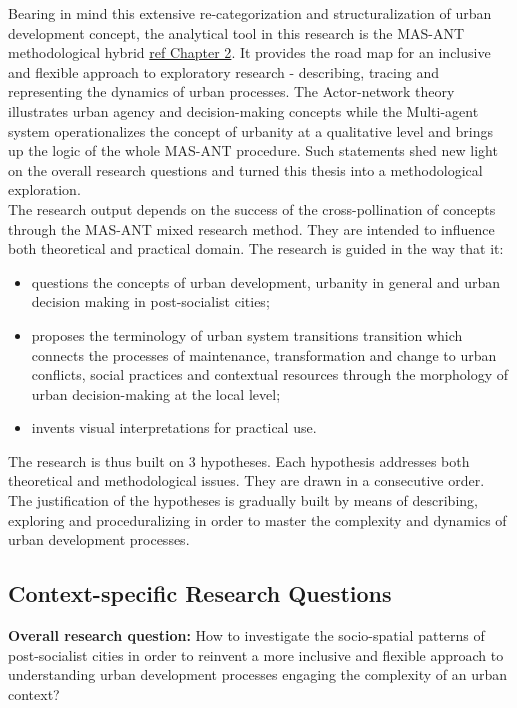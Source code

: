 \documentclass[11pt]{report}
\begin{document}
Bearing in mind this extensive re-categorization and structuralization of urban development concept, the analytical tool in this research is the MAS-ANT methodological hybrid \href{ref}{ref Chapter 2}. 
It provides the road map for an inclusive and flexible approach to exploratory research - describing, tracing and representing the dynamics of urban processes.
The Actor-network theory illustrates urban agency and decision-making concepts while the Multi-agent system operationalizes the concept of urbanity at a qualitative level and brings up the logic of the whole MAS-ANT procedure. Such statements shed new light on the overall research questions and turned this thesis into a methodological exploration.
\\
The research output depends on the success of the cross-pollination of concepts through the MAS-ANT mixed research method. They are intended to influence both theoretical and practical domain. The research is guided in the way that it:
\begin{itemize}
\item questions the concepts of urban development, urbanity in general and urban decision making in post-socialist cities;
\item proposes the terminology of urban system transitions transition which connects the processes of maintenance, transformation and change to urban conflicts, social practices and contextual resources through the morphology of urban decision-making at the local level;
\item invents visual interpretations for practical use.
\end{itemize}

The research is thus built on 3 hypotheses. Each hypothesis addresses both theoretical and methodological issues. They are drawn in a consecutive order. The justification of the hypotheses is gradually built by means of describing, exploring and proceduralizing in order to master the complexity and dynamics of urban development processes. 

\subsection{Context-specific Research Questions}

\textbf{Overall research question:} How to investigate the socio-spatial patterns of post-socialist cities in order to reinvent a more inclusive and flexible approach to understanding urban development processes engaging the complexity of an urban context? 
\end{document}
